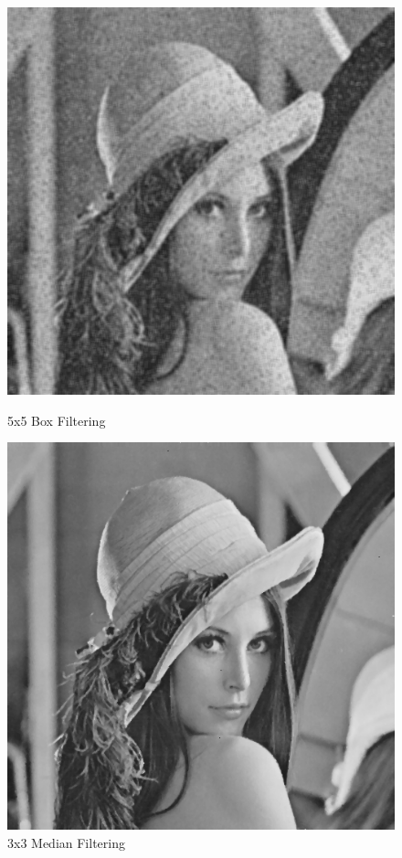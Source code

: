 \documentclass{article}
\begin{document}
\begin{figure}[H]
  \includegraphics[width=\linewidth]{img/snp5_box_5x5.png}
  \caption{5x5 Box Filtering}\label{fig:snp5_box_5x5}
\endminipage\hfill
{}
  \includegraphics[width=\linewidth]{img/snp5_median_3x3.png}
  \caption{3x3 Median Filtering}\label{fig:snp5_median_3x3}
\endminipage\hfill
\end{figure}
\end{document}
